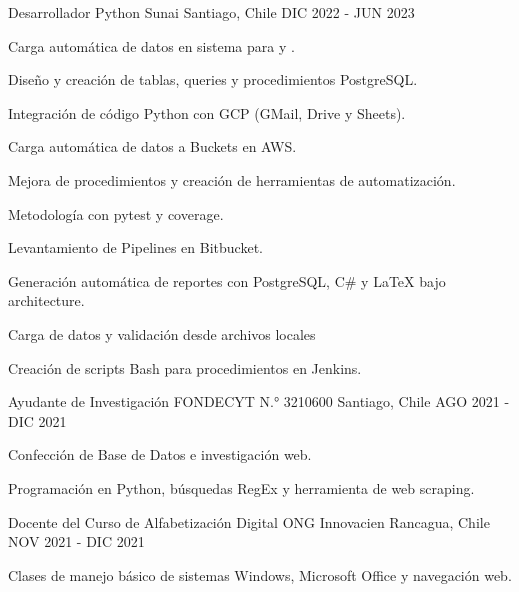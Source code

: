 \begin{cventries}
\cventry
{Desarrollador Python} %
{Sunai} %
{Santiago, Chile} %
{DIC 2022 - JUN 2023} %
{
	\begin{cvitems} %
		\item {Carga automática de datos en sistema  para  y .}
		\item {Diseño y creación de tablas, queries y procedimientos PostgreSQL.}
		\item {Integración de código Python con GCP (GMail, Drive y Sheets).}
		\item {Carga automática de datos a Buckets en AWS.}
		\item {Mejora de procedimientos y creación de herramientas de automatización.}
		\item {Metodología  con pytest y coverage.}
		\item {Levantamiento de Pipelines en Bitbucket.}
		\item {Generación automática de reportes con PostgreSQL, C\# y LaTeX bajo  architecture.}
		\item {Carga de datos y validación desde archivos  locales}
		\item {Creación de scripts Bash para procedimientos en Jenkins.}
	\end{cvitems}
}

  \cventry
    {Ayudante de Investigación} %
    {FONDECYT N.° 3210600} %
    {Santiago, Chile} %
    {AGO 2021 - DIC 2021} %
    {
      \begin{cvitems} %
        \item {Confección de Base de Datos e investigación web.}
        \item {Programación en Python, búsquedas RegEx y herramienta de web scraping.}
      \end{cvitems}
    }

  \cventry
    {Docente del Curso de Alfabetización Digital} %
    {ONG Innovacien} %
    {Rancagua, Chile} %
    {NOV 2021 - DIC 2021} %
    {
      \begin{cvitems} %
        \item {Clases de manejo básico de sistemas Windows, Microsoft Office y navegación web.}
      \end{cvitems}
    }


\end{cventries}
